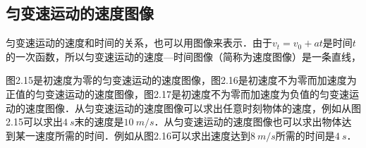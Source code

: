 \newpage

\subsection{匀变速运动的速度图像}

匀变速运动的速度和时间的关系，也可以用图像来表示．由于$v_t=v_0+at$是时间$t$的一次函数，所以匀变速运动的速度---时间图像（简称为速度图像）是一条直线，

图2.15是初速度为零的匀变速运动的速度图像，图2.16是初速度不为零而加速度为正值的匀变速运动的速度图像，图2.17是初速度不为零而加速度为负值的匀变速运动的速度图像．从匀变速运动的速度图像可以求出任意时刻物体的速度，例如从图2.15可以求出$\qty{4}{s}$末的速度是$\qty{10}{m/s}$．从匀变速运动的速度图像也可以求出物体达到某一速度所需的时间．例如从图2.16可以求出速度达到$\qty{8}{m/s}$所需的时间是$\qty{4}{s}$．
